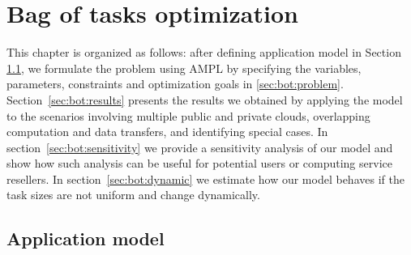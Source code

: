 { %

\newcommand{\INSTANCE}{I}
\newcommand{\STORAGE}{S}
\newcommand{\PROVIDER}{P}
\newcommand{\PROVIDERINSTANCES}{PI}
\newcommand{\LOCALSTORAGE}{LS}

\newcommand{\instancePrice}{p^I}
\newcommand{\ccu}{ccu}
\newcommand{\instanceTransferPriceIn}{p^{Iin}}
\newcommand{\instanceTransferPriceOut}{p^{Iout}}
\newcommand{\storageTransferPriceOut}{p^{Sout}}
\newcommand{\storageTransferPriceIn}{p^{Sin}}
\newcommand{\transferRate}{r}
\newcommand{\totalTasks}{A^{tot}}
\newcommand{\transferTime}{t^{net}}
\newcommand{\execTime}{t^x}
\newcommand{\dataSizeIn}{d^{in}}
\newcommand{\dataSizeOut}{d^{out}}
\newcommand{\requestPrice}{p^{R}}
\newcommand{\deadline}{t^D}
\newcommand{\instanceDeadline}{t^d}
\newcommand{\unitTime}{t^u}
\newcommand{\transferCost}{c^t}
\newcommand{\tasksPerDeadline}{a^d}
\newcommand{\timeQuantum}{t^q}
\newcommand{\tasksPerTimeQuantum}{a^q}
\newcommand{\providerMaxMachines}{n^{Pmax}}
\newcommand{\instanceMaxMachines}{n^{Imax}}

\newcommand{\NumberInstances}{N}
\newcommand{\TaskAssignment}{A}
\newcommand{\DataAssignment}{D}
\newcommand{\TailTaskHours}{R}
\newcommand{\HasTail}{H}

\chapter{Bag of tasks optimization}
\label{chap:formulation-bag-of-tasks} 

  This chapter is organized as follows: after defining application model in Section \ref{sec:bot:appmodel}, we formulate the problem using AMPL by specifying the variables, parameters, constraints and optimization goals in \ref{sec:bot:problem}. Section~\ref{sec:bot:results} presents the results we obtained by applying the model to the scenarios involving multiple public and private clouds, overlapping computation and data transfers, and identifying special cases. In section~\ref{sec:bot:sensitivity} we provide a sensitivity analysis of our model and show how such analysis can be useful for potential users or computing service resellers. In section~\ref{sec:bot:dynamic} we estimate how our model behaves if the task sizes are not uniform and change dynamically.

\section{Application model}
\label{sec:bot:appmodel}

}
